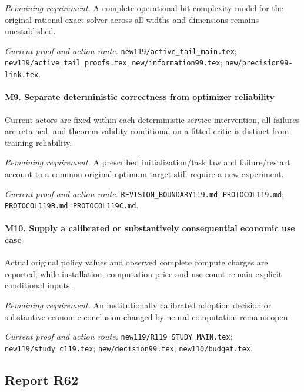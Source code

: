 \par\emph{Remaining requirement.} A complete operational bit-complexity model for the original rational exact solver across all widths and dimensions remains unestablished.

\par\emph{Current proof and action route.} \nolinkurl{new119/active_tail_main.tex}; \nolinkurl{new119/active_tail_proofs.tex}; \nolinkurl{new/information99.tex}; \nolinkurl{new/precision99-link.tex}.

\paragraph{M9. Separate deterministic correctness from optimizer reliability}

Current actors are fixed within each deterministic service intervention, all failures are retained, and theorem validity conditional on a fitted critic is distinct from training reliability.

\par\emph{Remaining requirement.} A prescribed initialization/\allowbreak{}task law and failure/\allowbreak{}restart account to a common original-optimum target still require a new experiment.

\par\emph{Current proof and action route.} \nolinkurl{REVISION_BOUNDARY119.md}; \nolinkurl{PROTOCOL119.md}; \nolinkurl{PROTOCOL119B.md}; \nolinkurl{PROTOCOL119C.md}.

\paragraph{M10. Supply a calibrated or substantively consequential economic use case}

Actual original policy values and observed complete compute charges are reported, while installation, computation price and use count remain explicit conditional inputs.

\par\emph{Remaining requirement.} An institutionally calibrated adoption decision or substantive economic conclusion changed by neural computation remains open.

\par\emph{Current proof and action route.} \nolinkurl{new119/R119_STUDY_MAIN.tex}; \nolinkurl{new119/study_c119.tex}; \nolinkurl{new/decision99.tex}; \nolinkurl{new110/budget.tex}.

\subsection{Report R62}

